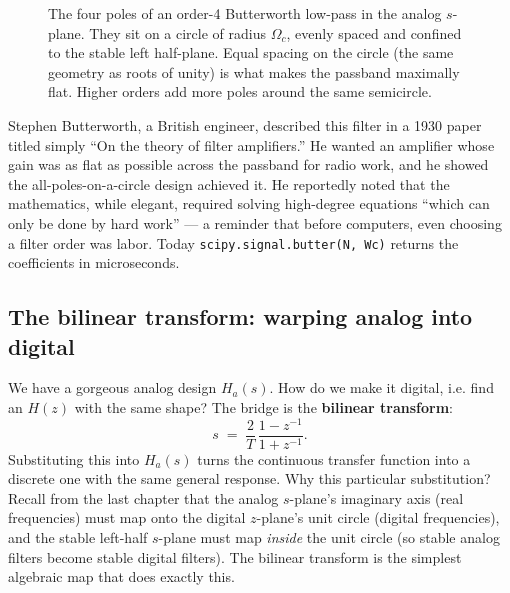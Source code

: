 \begin{figure}[H]
\centering
{}
\caption{The four poles of an order-4 Butterworth low-pass in the analog
$s$-plane. They sit on a circle of radius $\Omega_c$, evenly spaced and confined
to the stable left half-plane. Equal spacing on the circle (the same geometry as
roots of unity) is what makes the passband maximally flat. Higher orders add more
poles around the same semicircle.}
\label{ch16:fig-butter-poles}
\end{figure}

\begin{historybox}
Stephen Butterworth, a British engineer, described this filter in a 1930 paper
titled simply ``On the theory of filter amplifiers.'' He wanted an amplifier whose
gain was as flat as possible across the passband for radio work, and he showed the
all-poles-on-a-circle design achieved it. He reportedly noted that the
mathematics, while elegant, required solving high-degree equations ``which can
only be done by hard work'' --- a reminder that before computers, even choosing a
filter order was labor. Today \texttt{scipy.signal.butter(N, Wc)} returns the
coefficients in microseconds.
\end{historybox}

\subsection{The bilinear transform: warping analog into digital}
\label{ch16:bilinear}

We have a gorgeous analog design $H_a(s)$. How do we make it digital, i.e. find an
$H(z)$ with the same shape? The bridge is the \textbf{bilinear transform}:
\[
s \;=\; \frac{2}{T}\,\frac{1 - z^{-1}}{1 + z^{-1}}.
\]
Substituting this into $H_a(s)$ turns the continuous transfer function into a
discrete one with the same general response. Why this particular substitution?
Recall from the last chapter that the analog $s$-plane's imaginary axis (real
frequencies) must map onto the digital $z$-plane's unit circle (digital
frequencies), and the stable left-half $s$-plane must map \emph{inside} the unit
circle (so stable analog filters become stable digital filters). The bilinear
transform is the simplest algebraic map that does exactly this.

